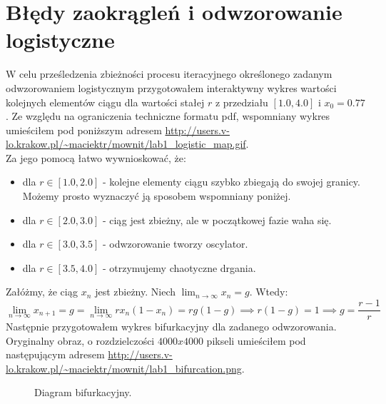 \documentclass{article}
\begin{document}
    \section{Błędy zaokrągleń i odwzorowanie logistyczne}
        W celu prześledzenia zbieżności procesu iteracyjnego określonego zadanym odwzorowaniem logistycznym przygotowałem interaktywny wykres wartości kolejnych elementów ciągu dla wartości stałej $r$ z przedziału $[1.0, 4.0]$ i $x_0 = 0.77$. Ze względu na ograniczenia techniczne formatu pdf, wspomniany wykres umieściłem pod poniższym adresem \url{http://users.v-lo.krakow.pl/~maciektr/mownit/lab1_logistic_map.gif}.\\
        Za jego pomocą łatwo wywnioskować, że:
        \begin{itemize}
            \item dla $r\in[1.0,2.0]$ - kolejne elementy ciągu szybko zbiegają do swojej granicy. Możemy prosto wyznaczyć ją sposobem wspomniany poniżej.
            \item dla $r\in[2.0,3.0]$ - ciąg jest zbieżny, ale w początkowej fazie waha się. 
            \item dla $r\in[3.0,3.5]$ - odwzorowanie tworzy oscylator.
            \item dla $r\in[3.5,4.0]$ - otrzymujemy chaotyczne drgania. 
        \end{itemize}
        Załóżmy, że ciąg $x_n$ jest zbieżny. Niech $\lim_{n\to\infty} x_n=g$. Wtedy: 
        $$\lim_{n\to\infty} x_{n+1}=g=\lim_{n\to\infty} rx_n(1-x_n)=rg(1-g)\implies r(1-g)=1 \implies g=\frac{r-1}{r}$$
        Następnie przygotowałem wykres bifurkacyjny dla zadanego odwzorowania. Oryginalny obraz, o rozdzielczości $4000x4000$ pikseli umieściłem pod następującym adresem \url{http://users.v-lo.krakow.pl/~maciektr/mownit/lab1_bifurcation.png}.
        \begin{figure}[h!]
            \centering
            \caption{Diagram bifurkacyjny.}
        \end{figure}
\end{document}
